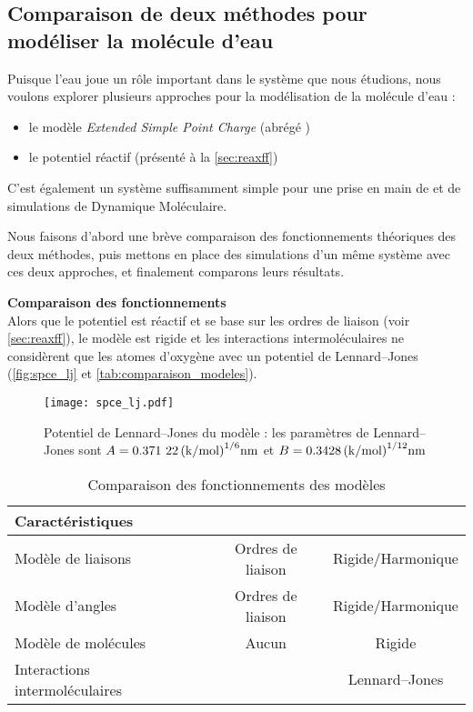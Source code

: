 \subsection{Comparaison de deux méthodes pour modéliser la molécule d'eau} \label{sec:h2o}

Puisque l'eau joue un rôle important dans le système que nous étudions, nous voulons explorer plusieurs approches pour la modélisation de la molécule d'eau :
\begin{itemize}
    \item le modèle \emph{Extended Simple Point Charge} (abrégé \spce{})\cite{pullman_interaction_1981}\cite{berendsen_missing_1987}
    \item le potentiel réactif \reaxff{} (présenté à la \autoref{sec:reaxff})
\end{itemize}

C'est également un système suffisamment simple pour une prise en main de \lammps{} et de simulations de Dynamique Moléculaire.

Nous faisons d'abord une brève comparaison des fonctionnements théoriques des deux méthodes, puis mettons en place des simulations d'un même système avec ces deux approches, et finalement comparons leurs résultats.

\textbf{Comparaison des fonctionnements}\\
Alors que le potentiel \reaxff{} est réactif et se base sur les ordres de liaison (voir \autoref{sec:reaxff}), le modèle \spce{} est rigide et les interactions intermoléculaires ne considèrent que les atomes d'oxygène avec un potentiel de Lennard--Jones (\autoref{fig:spce_lj} et \autoref{tab:comparaison_modeles}).

\begin{figure}[h!]
    \centering
    \texttt{[image: spce\_lj.pdf]}
    \caption{Potentiel de Lennard--Jones du modèle \spce{} : {\footnotesize les paramètres de Lennard--Jones sont $A = \qty{0.37122}{(\kilo \cal \per \mol)\tothe{1/6} \nano \meter}$ et $B = \qty{0.3428}{(\kilo \cal \per \mol)\tothe{1/12} \nano \meter}$}}
    \label{fig:spce_lj}
\end{figure}

\begin{table}[h!]
    \centering
    \begin{tabular}{l || c | c}
        \hline
        Caractéristiques               & \reaxff{}         & \spce{}           \\
        \hline
        Modèle de liaisons             & Ordres de liaison & Rigide/Harmonique \\
        Modèle d'angles                & Ordres de liaison & Rigide/Harmonique \\
        Modèle de molécules            & Aucun             & Rigide            \\
        Interactions intermoléculaires & \reaxff{}         & Lennard--Jones    \\
        \hline
    \end{tabular}
    \caption{Comparaison des fonctionnements des modèles}
    \label{tab:comparaison_modeles}
\end{table}

